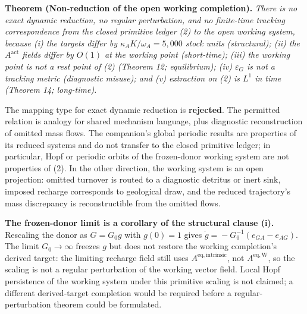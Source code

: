 \documentclass[11pt]{article}
\begin{document}
\textbf{Theorem (Non-reduction of the open working completion).} \emph{There is no exact dynamic reduction, no regular perturbation, and no finite-time tracking correspondence from the closed primitive ledger (2) to the open working system, because (i) the targets differ by \(\kappa_A K/\omega_A = 5{,}000\) stock units (structural); (ii) the \(A^{\mathrm{act}}\) fields differ by \(O(1)\) at the working point (short-time); (iii) the working point is not a rest point of (2) (Theorem 12; equilibrium); (iv) \(\varepsilon_G\) is not a tracking metric (diagnostic misuse); and (v) extraction on (2) is \(L^1\) in time (Theorem 14; long-time).}

The mapping type for exact dynamic reduction is \textbf{rejected}. The permitted relation is analogy for shared mechanism language, plus diagnostic reconstruction of omitted mass flows. The companion's global periodic results are properties of its reduced systems and do not transfer to the closed primitive ledger; in particular, Hopf or periodic orbits of the frozen-donor working system are not properties of (2). In the other direction, the working system is an open projection: omitted turnover is routed to a diagnostic detritus or inert sink, imposed recharge corresponds to geological draw, and the reduced trajectory's mass discrepancy is reconstructible from the omitted flows.

\textbf{The frozen-donor limit is a corollary of the structural clause (i).} Rescaling the donor as \(G = G_0 g\) with \(g(0) = 1\) gives \(\dot g =\allowbreak{} -G_0^{-1}(e_{GA} - e_{AG})\). The limit \(G_0 \to \infty\) freezes \(g\) but does not restore the working completion's derived target: the limiting recharge field still uses \(A^{\mathrm{eq,intrinsic}}\), not \(A^{\mathrm{eq,W}}\), so the scaling is not a regular perturbation of the working vector field. Local Hopf persistence of the working system under this primitive scaling is not claimed; a different derived-target completion would be required before a regular-perturbation theorem could be formulated.
\end{document}
